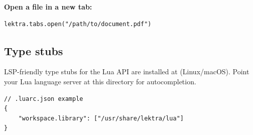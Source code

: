 \documentclass[a4paper,12pt]{article}
\begin{document}
\textbf{Open a file in a new tab:}

\begin{tcolorbox}[colback=gray!5, colframe=gray!40, boxrule=0.4pt, arc=4pt,
    fontupper=\ttfamily\small]
\begin{verbatim}
lektra.tabs.open("/path/to/document.pdf")
\end{verbatim}
\end{tcolorbox}

\subsection{Type stubs}

LSP-friendly type stubs for the Lua API are installed at
 (Linux/macOS). Point your Lua language server at this directory for autocompletion.

\begin{tcolorbox}[colback=gray!5, colframe=gray!40, boxrule=0.4pt, arc=4pt,
    fontupper=\ttfamily\small]
\begin{verbatim}
// .luarc.json example
{
    "workspace.library": ["/usr/share/lektra/lua"]
}
\end{verbatim}
\end{tcolorbox}

\end{document}
